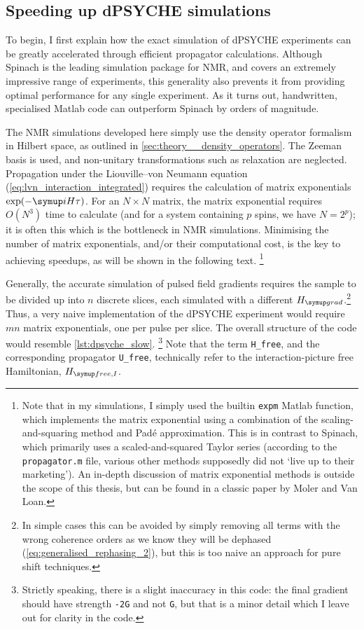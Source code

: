 \subsection{Speeding up dPSYCHE simulations}
\label{subsec:pureshift__dpsyche_simulations}

To begin, I first explain how the exact simulation of dPSYCHE experiments can be greatly accelerated through efficient propagator calculations.
Although Spinach\autocite{Hogben2011JMR} is the leading simulation package for NMR, and covers an extremely impressive range of experiments, this generality also prevents it from providing optimal performance for any single experiment.
As it turns out, handwritten, specialised Matlab code can outperform Spinach by orders of magnitude.

The NMR simulations developed here simply use the density operator formalism in Hilbert space, as outlined in \cref{sec:theory__density_operators}.
The Zeeman basis is used, and non-unitary transformations such as relaxation are neglected.
Propagation under the Liouville--von Neumann equation (\cref{eq:lvn_interaction_integrated}) requires the calculation of matrix exponentials $\exp(-\mi H\tau)$.
For an $N \times N$ matrix, the matrix exponential requires $O(N^3)$ time to calculate (and for a system containing $p$ spins, we have $N = 2^p$); it is often this which is the bottleneck in NMR simulations.
Minimising the number of matrix exponentials, and/or their computational cost, is the key to achieving speedups, as will be shown in the following text.%
\footnote{Note that in my simulations, I simply used the builtin \texttt{expm} Matlab function, which implements the matrix exponential using a combination of the scaling-and-squaring method and Pad\'e approximation\autocite{Higham2005SIAMJMAA}.
This is in contrast to Spinach, which primarily uses a scaled-and-squared Taylor series (according to the \texttt{propagator.m} file, various other methods supposedly did not `live up to their marketing').
An in-depth discussion of matrix exponential methods is outside the scope of this thesis, but can be found in a classic paper by Moler and Van Loan\autocite{Moler2003SIAMR}.}

Generally, the accurate simulation of pulsed field gradients requires the sample to be divided up into $n$ discrete slices, each simulated with a different $\Hgrad$.\footnote{In simple cases this can be avoided by simply removing all terms with the wrong coherence orders as we know they will be dephased (\cref{eq:generalised_rephasing_2}), but this is too naive an approach for pure shift techniques.}
Thus, a very naive implementation of the dPSYCHE experiment would require $mn$ matrix exponentials, one per pulse per slice.
The overall structure of the code would resemble \cref{lst:dpsyche_slow}.%
\footnote{Strictly speaking, there is a slight inaccuracy in this code: the final gradient should have strength \texttt{-2G} and not \texttt{G}, but that is a minor detail which I leave out for clarity in the code.}
Note that the term \texttt{H\_free}, and the corresponding propagator \texttt{U\_free}, technically refer to the interaction-picture free Hamiltonian, $\HfreeI$.

